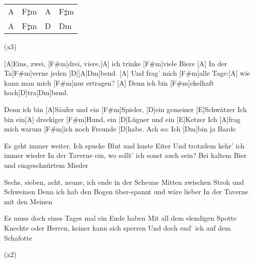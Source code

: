 

\begin{guitar}
	{\footnotesize\begin{tabular}{|l|l|l|l|}
			A & F$\sharp$m & A & F$\sharp$m \\
			A & F$\sharp$m & D & Dm
	\end{tabular}} (x3) 
	
	[A]Eins, zwei, [F#m]drei, viere,[A] ich trinke [F#m]viele Biere
	[A] In der Ta[F#m]verne jeden [D|]A[Dm]bend.
	[A] Und frag' mich [F#m]alle Tage:[A] wie kann man mich [F#m]nur ertragen?
	[A] Denn ich bin [F#m]ekelhaft hoch[D]tra[Dm]bend.
	
	Denn ich bin [A]Säufer und ein [F#m]Spieler, [D]ein gemeiner [E]Schwätzer
	Ich bin ein[A] dreckiger [F#m]Hund, ein [D]Lügner und ein [E]Ketzer
	Ich [A]frag mich warum [F#m]ich noch Freunde [D]habe. Ach so: Ich [Dm]bin ja Barde
	
	Es geht immer weiter. Ich spucke Blut und huste Eiter
	Und trotzdem kehr' ich immer wieder
	In der Taverne ein, wo sollt' ich sonst auch sein?
	Bei kaltem Bier und eingeschnürtem Mieder
	
	 
	
	Sechs, sieben, acht, neune, ich ende in der Scheune
	Mitten zwischen Stroh und Schweinen
	Denn ich hab den Bogen über-spannt und wäre lieber
	In der Taverne mit den Meinen
	
	 
	
	Es muss doch eines Tages mal ein Ende haben
	Mit all dem elendigen Spotte
	Knechte oder Herren, keiner kann sich sperren
	Und doch end' ich auf dem Schafotte
	
	  (x2)

\end{guitar}